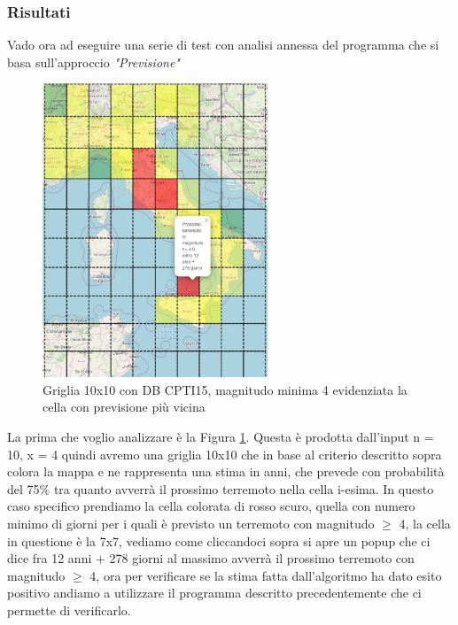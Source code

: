 \subsubsection{Risultati}

Vado ora ad eseguire una serie di test con analisi annessa del programma che si basa sull'approccio \textit{"Previsione"}

\begin{figure}[H]
   \centering
   \includegraphics[width=0.600\textwidth]{images/10x10_mag4_12anniEvidenziato_CPTI15.jpg}
   \caption{Griglia 10x10 con DB CPTI15, magnitudo minima 4 evidenziata la cella con previsione pi\`u vicina}
   \label{fig:10x10_mag4_12anniEvidenziato}
\end{figure}

La prima che voglio analizzare \`e la Figura \ref{fig:10x10_mag4_12anniEvidenziato}. Questa \`e prodotta dall'input n = 10, x = 4 quindi avremo una griglia 10x10 che in base al criterio descritto sopra colora la mappa e ne rappresenta una stima in anni, che prevede con probabilit\`a del 75\% tra quanto avverr\`a il prossimo terremoto nella cella i-esima. In questo caso specifico prendiamo la cella colorata di rosso scuro, quella con numero minimo di giorni per i quali \`e previsto un terremoto con magnitudo $\ge$ 4, la cella in questione \`e la 7x7, vediamo come cliccandoci sopra si apre un popup che ci dice fra 12 anni + 278 giorni al massimo avverr\`a il prossimo terremoto con magnitudo $\ge$ 4, ora per verificare se la stima fatta dall'algoritmo ha dato esito positivo andiamo a utilizzare il programma descritto precedentemente che ci permette di verificarlo.

